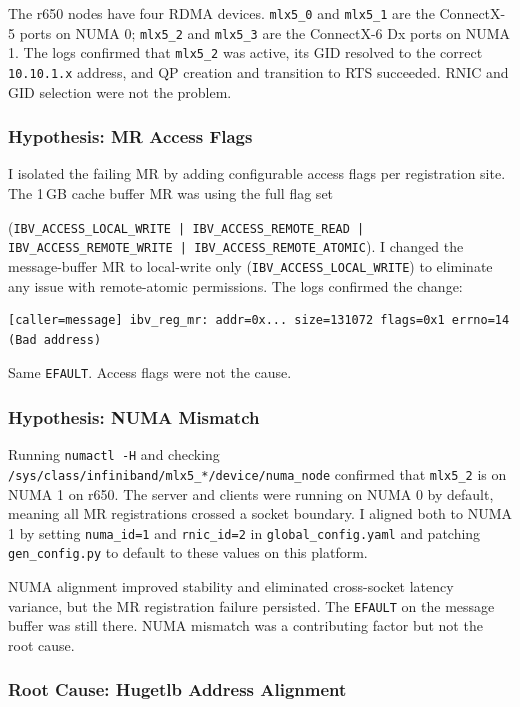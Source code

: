 \documentclass[10pt]{article}
\begin{document}
The r650 nodes have four RDMA devices.
\texttt{mlx5\_0} and \texttt{mlx5\_1} are the ConnectX-5 ports on NUMA 0;
\texttt{mlx5\_2} and \texttt{mlx5\_3} are the ConnectX-6 Dx ports on NUMA 1.
The logs confirmed that \texttt{mlx5\_2} was active, its GID resolved to the
correct \texttt{10.10.1.x} address, and QP creation and transition to RTS succeeded.
RNIC and GID selection were not the problem.

\subsubsection{Hypothesis: MR Access Flags}

I isolated the failing MR by adding configurable access flags per registration site.
The 1\,GB cache buffer MR was using the full flag set

(\texttt{IBV\_ACCESS\_LOCAL\_WRITE | IBV\_ACCESS\_REMOTE\_READ |
IBV\_ACCESS\_REMOTE\_WRITE |
IBV\_ACCESS\_REMOTE\_ATOMIC}).
I changed the message-buffer MR to local-write only (\texttt{IBV\_ACCESS\_LOCAL\_WRITE})
to eliminate any issue with remote-atomic permissions.
The logs confirmed the change:
\begin{lstlisting}
[caller=message] ibv_reg_mr: addr=0x... size=131072 flags=0x1 errno=14 (Bad address)
\end{lstlisting}
Same \texttt{EFAULT}.
Access flags were not the cause.

\subsubsection{Hypothesis: NUMA Mismatch}

Running \texttt{numactl -H} and checking
\texttt{/sys/class/infiniband/mlx5\_*/device/numa\_node}
confirmed that \texttt{mlx5\_2} is on NUMA 1 on r650.
The server and clients were running on NUMA 0 by default, meaning all MR
registrations crossed a socket boundary.
I aligned both to NUMA 1 by setting \texttt{numa\_id=1} and \texttt{rnic\_id=2}
in \texttt{global\_config.yaml} and patching \texttt{gen\_config.py} to default
to these values on this platform.

NUMA alignment improved stability and eliminated cross-socket latency variance,
but the MR registration failure persisted.
The \texttt{EFAULT} on the message buffer was still there.
NUMA mismatch was a contributing factor but not the root cause.

\subsubsection{Root Cause: Hugetlb Address Alignment}
\end{document}
